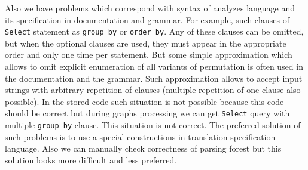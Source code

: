 Also we have problems which correspond with syntax of analyzes language and its specification in 
documentation and grammar. For example, such clauses of \verb|Select| statement as \verb|group by| or \verb|order by|. 
Any of these clauses can be omitted, but when the optional clauses are used, they must appear in the appropriate 
order and only one time per statement. But some simple approximation which allows to omit explicit enumeration 
of all variants of permutation is often used in the documentation and the grammar. Such approximation allows 
to accept input strings with arbitrary repetition of clauses (multiple repetition of one clause also possible). 
In the stored code such situation is not possible because this code should be correct but during graphs 
processing we can get \verb|Select| query with multiple \verb|group by| clause. This situation is not 
correct. The preferred solution of such problems is to use a special constructions in translation 
specification language. Also we can manually check correctness of parsing forest but this solution 
looks more difficult and less preferred.
